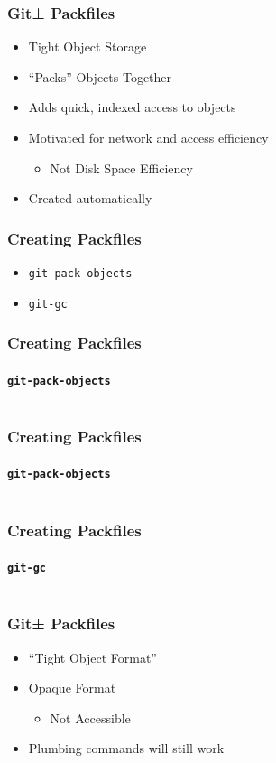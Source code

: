 \documentclass[]{beamer}
\begin{document}
\begin{frame}
\frametitle{Git± Packfiles}
\begin{itemize}
\item<2->{Tight Object Storage}
\item<3->{``Packs'' Objects Together}
\item<4->{Adds quick, indexed access to objects}
\item<5->{Motivated for network and access efficiency}
\begin{itemize}
\item<5->{Not Disk Space Efficiency}
\end{itemize}
\item<6->{Created automatically}
\end{itemize}
\end{frame}

\begin{frame}
\frametitle{Creating Packfiles}
\begin{itemize}
\item<1->{\texttt{git-pack-objects}}
\item<2->{\texttt{git-gc}}
\end{itemize}
\end{frame}

\begin{frame}[fragile]
\frametitle{Creating Packfiles}
\framesubtitle{\texttt{git-pack-objects}}
\inputminted[fontsize=\scriptsize{}]{bash}{code/packfiles/1}
\end{frame}

\begin{frame}[fragile]
\frametitle{Creating Packfiles}
\framesubtitle{\texttt{git-pack-objects}}
\inputminted{bash}{code/packfiles/2}
\end{frame}

\begin{frame}[fragile]
\frametitle{Creating Packfiles}
\framesubtitle{\texttt{git-gc}}
\inputminted{bash}{code/packfiles/3}
\end{frame}

\begin{frame}
\frametitle{Git± Packfiles}
\begin{itemize}
\item{``Tight Object Format''}
\item{Opaque Format}
\begin{itemize}
\item{Not Accessible}
\end{itemize}
\item{Plumbing commands will still work}
\end{itemize}
\end{frame}
\end{document}
